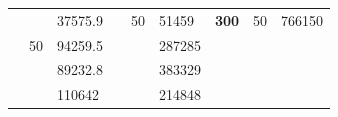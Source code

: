 \begin{table}[]
\begin{tabular}{|cclccllll}
\rowcolor[HTML]{DDFDFF} 
\multicolumn{1}{|c|}{\cellcolor[HTML]{FFFFC7}}                                & \multicolumn{1}{c|}{\cellcolor[HTML]{DDFDFF}}                      & \multicolumn{1}{l|}{\cellcolor[HTML]{DAE8FC}37575.9}   & \multicolumn{1}{c|}{\cellcolor[HTML]{FFFFC7}}                                & \multicolumn{1}{c|}{\multirow{-10}{*}{\cellcolor[HTML]{DDFDFF}50}}  & \multicolumn{1}{l|}{\cellcolor[HTML]{DDFDFF}51459}     & \multicolumn{1}{c|}{\multirow{-19}{*}{\cellcolor[HTML]{FFFFC7}\textbf{300}}} & \multicolumn{1}{c|}{\multirow{-10}{*}{\cellcolor[HTML]{DDFDFF}50}} & \multicolumn{1}{l|}{\cellcolor[HTML]{DDFDFF}766150}    \\ \cline{3-3} \cline{5-9} 
\multicolumn{1}{|c|}{\cellcolor[HTML]{FFFFC7}}                                & \multicolumn{1}{c|}{\multirow{-10}{*}{\cellcolor[HTML]{DDFDFF}50}} & \multicolumn{1}{l|}{\cellcolor[HTML]{DDFDFF}94259.5}   & \multicolumn{1}{c|}{\cellcolor[HTML]{FFFFC7}}                                & \multicolumn{1}{c|}{\cellcolor[HTML]{DAE8FC}}                       & \multicolumn{1}{l|}{\cellcolor[HTML]{DAE8FC}287285}    &                                                                              &                                                                    &                                                        \\ \cline{2-3} \cline{6-6}
\multicolumn{1}{|c|}{\cellcolor[HTML]{FFFFC7}}                                & \multicolumn{1}{c|}{\cellcolor[HTML]{DAE8FC}}                      & \multicolumn{1}{l|}{\cellcolor[HTML]{DAE8FC}89232.8}   & \multicolumn{1}{c|}{\cellcolor[HTML]{FFFFC7}}                                & \multicolumn{1}{c|}{\cellcolor[HTML]{DAE8FC}}                       & \multicolumn{1}{l|}{\cellcolor[HTML]{DDFDFF}383329}    &                                                                              &                                                                    &                                                        \\ \cline{3-3} \cline{6-6}
\multicolumn{1}{|c|}{\cellcolor[HTML]{FFFFC7}}                                & \multicolumn{1}{c|}{\cellcolor[HTML]{DAE8FC}}                      & \multicolumn{1}{l|}{\cellcolor[HTML]{DDFDFF}110642}    & \multicolumn{1}{c|}{\cellcolor[HTML]{FFFFC7}}                                & \multicolumn{1}{c|}{\cellcolor[HTML]{DAE8FC}}                       & \multicolumn{1}{l|}{\cellcolor[HTML]{DAE8FC}214848}    &                                                                              &                                                                    &                                                        \\ \cline{3-3} \cline{6-6}

\end{tabular}
\end{table}

